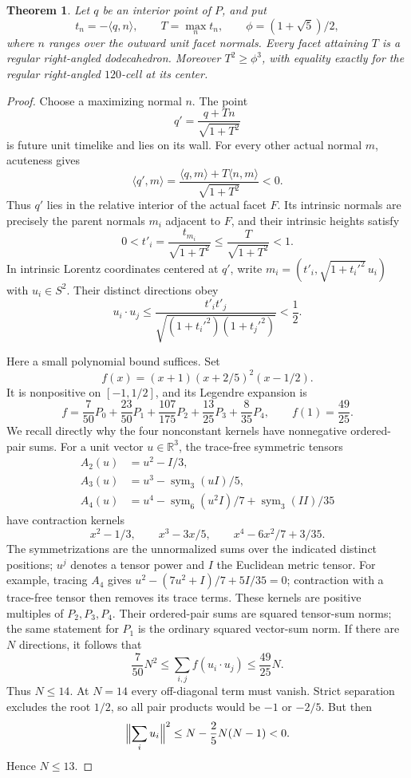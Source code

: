 \documentclass[11pt]{article}
\newtheorem{theorem}{Theorem}
\theoremstyle{remark}
\newcommand{\ip}[2]{\langle #1,#2\rangle}
\begin{document}
\begin{theorem}\label{thm:farthest-dodecahedron}
Let $q$ be an interior point of $P$, and put
\[
 t_n=-\ip qn,\qquad T=\max_n t_n,
 \qquad \phi=(1+\sqrt5)/2,
\]
where $n$ ranges over the outward unit facet normals. Every facet
attaining $T$ is a regular right-angled dodecahedron. Moreover
$T^2\ge\phi^3$, with equality exactly for the regular right-angled
$120$-cell at its center.
\end{theorem}
\begin{proof}
Choose a maximizing normal $n$. The point
\[
 q'=\frac{q+Tn}{\sqrt{1+T^2}}
\]
is future unit timelike and lies on its wall. For every other actual
normal $m$, acuteness gives
\[
 \ip{q'}m=\frac{\ip qm+T\ip nm}{\sqrt{1+T^2}}<0.
\]
Thus $q'$ lies in the relative interior of the actual facet $F$.
Its intrinsic normals are precisely the parent normals $m_i$ adjacent
to $F$, and their intrinsic heights satisfy
\[
 0<t'_i=\frac{t_{m_i}}{\sqrt{1+T^2}}
       \le\frac{T}{\sqrt{1+T^2}}<1.
\]
In intrinsic Lorentz coordinates centered at $q'$, write
$m_i=(t'_i,\sqrt{1+t_i'^2}\,u_i)$ with $u_i\in S^2$.
Their distinct directions obey
\[
 u_i\cdot u_j\le
 \frac{t'_it'_j}{\sqrt{(1+t_i'^2)(1+t_j'^2)}}<\frac12.
\]

Here a small polynomial bound suffices. Set
\[
 f(x)=(x+1)(x+2/5)^2(x-1/2).
\]
It is nonpositive on $[-1,1/2]$, and its Legendre expansion is
\[
 f=\frac7{50}P_0+\frac{23}{50}P_1+\frac{107}{175}P_2
       +\frac{13}{25}P_3+\frac8{35}P_4,
 \qquad f(1)=\frac{49}{25}.
\]
We recall directly why the four nonconstant kernels have nonnegative
ordered-pair sums. For a unit vector $u\in\mathbb R^3$, the trace-free
symmetric tensors
\[
 \begin{split}
 A_2(u)&=u^2-I/3,\\
 A_3(u)&=u^3-\operatorname{sym}_3(uI)/5,\\
 A_4(u)&=u^4-\operatorname{sym}_6(u^2I)/7
                       +\operatorname{sym}_3(II)/35
 \end{split}
\]
have contraction kernels
\[
 x^2-1/3,\qquad x^3-3x/5,\qquad x^4-6x^2/7+3/35.
\]
The symmetrizations are the unnormalized sums over the indicated
distinct positions; $u^j$ denotes a tensor power and $I$ the Euclidean
metric tensor. For example, tracing $A_4$ gives
$u^2-(7u^2+I)/7+5I/35=0$; contraction with a trace-free tensor
then removes its trace terms. These kernels are positive multiples of
$P_2,P_3,P_4$. Their ordered-pair sums are squared tensor-sum norms;
the same statement for $P_1$ is the ordinary squared vector-sum norm.
If there are $N$ directions, it follows that
\[
 \frac7{50}N^2\le\sum_{i,j}f(u_i\cdot u_j)
                    \le\frac{49}{25}N.
\]
Thus $N\le14$. At $N=14$ every off-diagonal term must vanish.
Strict separation excludes the root $1/2$, so all pair products would
be $-1$ or $-2/5$. But then
\[
 \Bigl\|\sum_i u_i\Bigr\|^2
 \le N-\frac25N(N-1)<0.
\]
Hence $N\le13$.


\end{proof}
\end{document}
